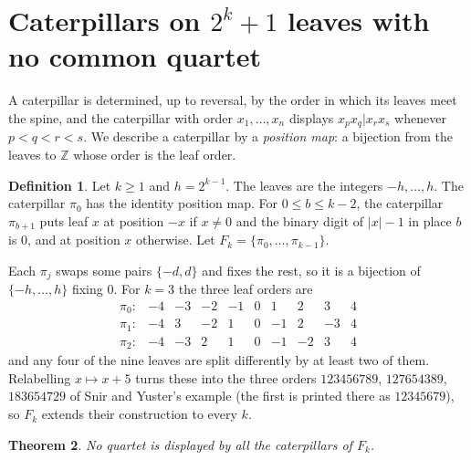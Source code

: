 \documentclass[11pt]{amsart}
\newtheorem{theorem}{Theorem}[section]
\theoremstyle{definition}
\newtheorem{definition}[theorem]{Definition}
\begin{document}
\section{Caterpillars on $2^k+1$ leaves with no common quartet}\label{sec:lower}

A caterpillar is determined, up to reversal, by the order in which its leaves meet the spine, and the caterpillar
with order $x_1,\dots,x_n$ displays $x_px_q|x_rx_s$ whenever $p<q<r<s$. We describe a caterpillar by a
\emph{position map}: a bijection from the leaves to $\mathbb{Z}$ whose order is the leaf order.

\begin{definition}\label{def:Fk}
Let $k\ge1$ and $h=2^{k-1}$. The leaves are the integers $-h,\dots,h$. The caterpillar $\pi_0$ has the identity
position map. For $0\le b\le k-2$, the caterpillar $\pi_{b+1}$ puts leaf $x$ at position $-x$ if $x\ne0$ and the
binary digit of $|x|-1$ in place $b$ is $0$, and at position $x$ otherwise. Let $F_k=\{\pi_0,\dots,\pi_{k-1}\}$.
\end{definition}

Each $\pi_j$ swaps some pairs $\{-d,d\}$ and fixes the rest, so it is a bijection of $\{-h,\dots,h\}$ fixing $0$.
For $k=3$ the three leaf orders are
\[
\begin{array}{rrrrrrrrrr}
\pi_0:& -4&-3&-2&-1&0&1&2&3&4\\
\pi_1:& -4&3&-2&1&0&-1&2&-3&4\\
\pi_2:& -4&-3&2&1&0&-1&-2&3&4
\end{array}
\]
and any four of the nine leaves are split differently by at least two of them. Relabelling $x\mapsto x+5$ turns
these into the three orders $123456789$, $127654389$, $183654729$ of Snir and Yuster's example \cite[\S5]{SY} (the
first is printed there as $12345679$), so $F_k$ extends their construction to every $k$.

\begin{theorem}\label{thm:cat}
No quartet is displayed by all the caterpillars of $F_k$.
\end{theorem}
\end{document}
